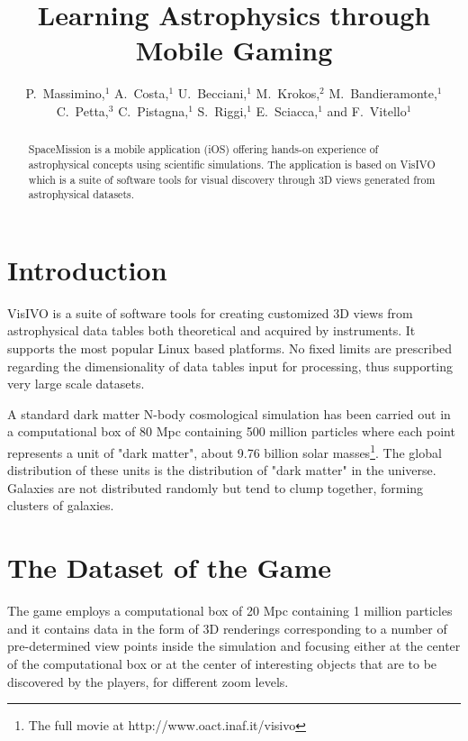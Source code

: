 
\resetcounters





\title{Learning Astrophysics through Mobile Gaming}
\author{P.~Massimino,$^1$ A.~Costa,$^1$ U.~Becciani,$^1$ M.~Krokos,$^2$ M.~Bandieramonte,$^1$ C.~Petta,$^3$ C.~Pistagna,$^1$ S.~Riggi,$^1$ E.~Sciacca,$^1$ and F.~Vitello$^1$
}


\begin{abstract}
SpaceMission is a mobile application (iOS) offering hands-on experience of astrophysical concepts using scientific simulations. The application is based on VisIVO which is a suite of software tools for visual discovery through 3D views generated from astrophysical datasets.
\end{abstract}

\section{Introduction}
VisIVO  is a suite of software tools for creating customized 3D views from astrophysical data tables both theoretical and acquired by instruments.
It supports the most popular Linux based platforms. No fixed limits are prescribed regarding the dimensionality of data tables input for processing, thus supporting very large scale datasets.

A standard dark matter N-body cosmological simulation has been carried out in a computational box of 80 Mpc containing 500 million particles where each point represents a unit  of "dark matter", about 9.76 billion solar masses\footnote{The full movie at http://www.oact.inaf.it/visivo}. The global distribution of these units is the distribution of "dark matter" in the universe. Galaxies are not distributed randomly but tend to clump together, forming clusters of galaxies.

\section{The Dataset of the Game}
The game employs a computational box of 20 Mpc containing 1 million particles and 
it contains data in the form of 3D renderings corresponding to a number of pre-determined view points inside the simulation and focusing either at the center of the computational box or at the center of interesting objects that are to be discovered by the players, for different zoom levels. 

